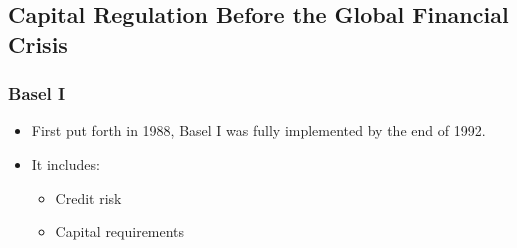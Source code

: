 
\subsection{Capital Regulation Before the Global Financial Crisis}



\subsubsection{Basel I}
\begin{itemize}
\item First put forth in 1988, Basel I was fully implemented by the end of 1992.
\item It includes:
    \begin{itemize}
    \item Credit risk
    \item Capital requirements
    \end{itemize}

\end{itemize}



